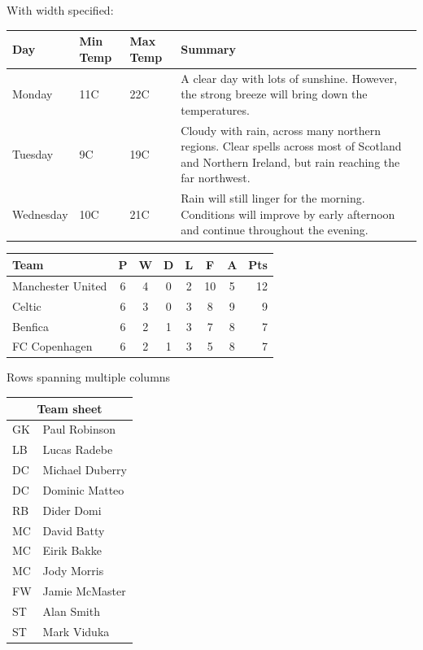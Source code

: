 \documentclass[11pt]{beamer}
\begin{document}
\begin{frame}{With width specified:}
	\begin{center}
		\begin{tabular}{ | l | l | l | p{5cm} |}
			\hline
			Day & Min Temp & Max Temp & Summary \\ \hline
			Monday & 11C & 22C & A clear day with lots of sunshine.  
			However, the strong breeze will bring down the temperatures. \\ \hline
			Tuesday & 9C & 19C & Cloudy with rain, across many northern regions. Clear spells 
			across most of Scotland and Northern Ireland, 
			but rain reaching the far northwest. \\ \hline
			Wednesday & 10C & 21C & Rain will still linger for the morning. 
			Conditions will improve by early afternoon and continue 
			throughout the evening. \\
			\hline
		\end{tabular}
	\end{center}
\end{frame}


\begin{frame}
	\huge
	\centering
	\begin{tabular}{l*{6}{c}r}
		Team              & P & W & D & L & F  & A & Pts \\
		\hline
		Manchester United & 6 & 4 & 0 & 2 & 10 & 5 & 12  \\
		Celtic            & 6 & 3 & 0 & 3 &  8 & 9 &  9  \\
		Benfica           & 6 & 2 & 1 & 3 &  7 & 8 &  7  \\
		FC Copenhagen     & 6 & 2 & 1 & 3 &  5 & 8 &  7  \\
	\end{tabular}
\end{frame}


\begin{frame}{Rows spanning multiple columns}
	\centering
	\Large
\begin{tabular}{ |l|l| }
	\hline
	\multicolumn{2}{|c|}{Team sheet} \\
	\hline
	GK & Paul Robinson \\
	LB & Lucas Radebe \\
	DC & Michael Duberry \\
	DC & Dominic Matteo \\
	RB & Dider Domi \\
	MC & David Batty \\
	MC & Eirik Bakke \\
	MC & Jody Morris \\
	FW & Jamie McMaster \\
	ST & Alan Smith \\
	ST & Mark Viduka \\
	\hline
\end{tabular}
\end{frame}
\end{document}
